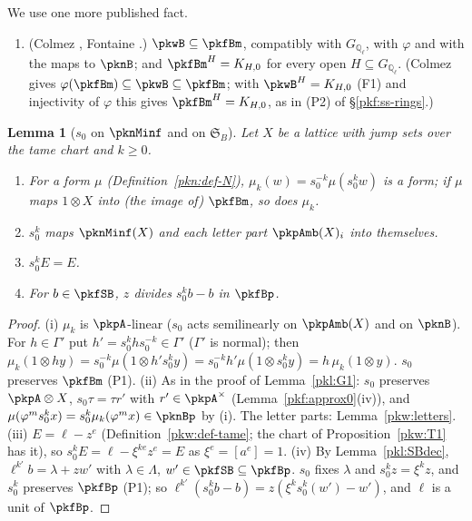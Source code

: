 \documentclass[10pt]{amsart}
\newtheorem{lemma}[theorem]{Lemma}
\theoremstyle{definition}
\theoremstyle{remark}
\newcommand{\Q}{\mathbb Q}
\begin{document}
We use one more published fact.
\begin{enumerate}
\item[(F6)] (Colmez \cite[\S III.2]{pkfColmez98}, Fontaine \cite[5.1.2]{pkfFontaineIII}.) $\pkwB\subseteq\pkfBm$,
compatibly with $G_{\Q_\ell}$, with $\varphi$ and with the maps to $\pknB$; and $\pkfBm^H=K_{H,0}$ for every open
$H\subseteq G_{\Q_\ell}$. (Colmez gives $\varphi(\pkfBm)\subseteq\pkwB\subseteq\pkfBm$; with $\pkwB^H=K_{H,0}$ (F1) and injectivity of $\varphi$ this gives $\pkfBm^H=K_{H,0}$, as in (P2) of \S\ref{pkf:ss-rings}.)
\end{enumerate}

\begin{lemma}[$s_0$ on $\pknMinf$ and on $\mathfrak S_B$]\label{pkw:s0}
Let $X$ be a lattice with jump sets over the tame chart and $k\ge0$.
\begin{enumerate}
\item[(i)] For a form $\mu$ (Definition~\ref{pkn:def-N}), $\mu_k(w)=s_0^{-k}\mu(s_0^kw)$ is a form; if $\mu$ maps
$1\otimes X$ into (the image of) $\pkfBm$, so does $\mu_k$.
\item[(ii)] $s_0^k$ maps $\pknMinf(X)$ and each letter part $\pkpAmb(X)_i$ into themselves.
\item[(iii)] $s_0^kE=E$.
\item[(iv)] For $b\in\pkfSB$, $z$ divides $s_0^kb-b$ in $\pkfBp$.
\end{enumerate}
\end{lemma}

\begin{proof}
(i) $\mu_k$ is $\pkpA$-linear ($s_0$ acts semilinearly on $\pkpAmb(X)$ and on $\pknB$). For $h\in\Gamma'$ put
$h'=s_0^khs_0^{-k}\in\Gamma'$ ($\Gamma'$ is normal); then $\mu_k(1\otimes hy)=s_0^{-k}\mu(1\otimes h's_0^ky)=
s_0^{-k}h'\mu(1\otimes s_0^ky)=h\,\mu_k(1\otimes y)$. $s_0$ preserves $\pkfBm$ (P1).
(ii) As in the proof of Lemma~\ref{pkl:G1}: $s_0$ preserves $\pkpA\otimes X$, $s_0\tau=\tau r'$ with $r'\in\pkpA^\times$
(Lemma~\ref{pkf:approx0}(iv)), and $\mu(\varphi^ms_0^kx)=s_0^k\mu_k(\varphi^mx)\in\pknBp$ by (i). The letter parts:
Lemma~\ref{pkw:letters}.
(iii) $E=\ell-z^e$ (Definition~\ref{pkw:def-tame}; the chart of Proposition~\ref{pkw:T1} has it), so
$s_0^kE=\ell-\xi^{ke}z^e=E$ as $\xi^e=[a^e]=1$.
(iv) By Lemma~\ref{pkl:SBdec}, $\ell^{k'}b=\lambda+zw'$ with $\lambda\in\Lambda$, $w'\in\pkfSB\subseteq\pkfBp$. $s_0$ fixes
$\lambda$ and $s_0^kz=\xi^kz$, and $s_0^k$ preserves $\pkfBp$ (P1); so $\ell^{k'}(s_0^kb-b)=z(\xi^ks_0^k(w')-w')$, and $\ell$
is a unit of $\pkfBp$.
\end{proof}
\end{document}
